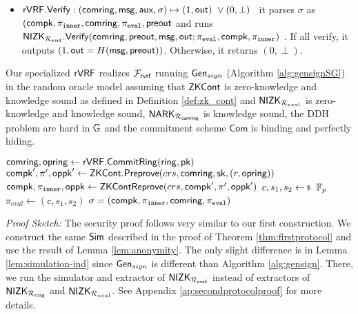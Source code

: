 \begin{itemize}
	\item  ${\mathsf{rVRF}}.{\mathsf{Verify}} : (\mathsf{comring},\mathsf{msg},\mathsf{aux},\sigma) \mapsto (1,{\mathsf{out}}) \,\, \lor (0,\perp)$ \,
	it parses $\sigma$ as $(\mathsf{compk}, \pi_{\mathtt{inner}},\mathsf{comring}, \pi_{\mathtt{eval}}, {\mathsf{preout}}$ and runs  ${\mathsf{NIZK}}_{\mathcal{R}_{\mathtt{rvrf}}}.{\mathsf{Verify}}(\mathsf{comring}, {\mathsf{preout}}, \mathsf{msg}, {\mathsf{out}}; \pi_{\mathtt{eval}},\mathsf{compk}, \pi_{\mathtt{inner}})$  . If all verify, it outputs $ (1,{\mathsf{out}} = H(\mathsf{msg},{\mathsf{preout}})) $. Otherwise, it returns $ (0,\perp) $.
\end{itemize}




\begin{theorem}\label{thm:rvrfspecial}
	Our specialized $ {\mathsf{rVRF}} $   realizes $ \mathcal{F}_{\textsf{rvrf}} $ running $ \mathsf{Gen}_{sign} $ (Algorithm \ref{alg:gensignSG}) \cite{canetti1,canetti2} in the random oracle model assuming that ${\mathsf{ZKCont}} $ is zero-knowledge and knowledge sound as defined in Definition \ref{def:zk_cont} and $ {\mathsf{NIZK}}_{\mathcal{R}_{eval}} $ is zero-knowledge and knowledge sound, $ \mathsf{NARK}_{\mathcal{R}_{\mathsf{comring}}} $ is knowledge sound, the DDH problem are hard in $ {\mathbb{G}}  $  and the commitment scheme $ \mathsf{Com} $ is binding and perfectly hiding. 
\end{theorem}
\begin{algorithm}
	\eprint{}{\scriptsize}
	\caption{$\Gen_{sign}(\ring, \sk= (x,r),\pk,\aux,\msg)$}
	\label{alg:gensignSG}	 	
	\begin{algorithmic}[1]
		\State $ \mathsf{comring}, \mathsf{opring} \leftarrow {\ensuremath{\mathsf{rVRF}}}.{\mathsf{CommitRing}}(\mathsf{ring}, \mathsf{pk}) $
		\State $ \mathsf{compk}', \pi', \mathsf{oppk}' \leftarrow {\ensuremath{\mathsf{ZKCont}}}.{\mathsf{Preprove}}(crs, \mathsf{comring},\mathsf{sk},(r,\mathsf{opring})) $
		\State $ \mathsf{compk}, \pi_{\mathtt{inner}}, \mathsf{oppk} \leftarrow {\ensuremath{\mathsf{ZKCont}}}{\ensuremath{\mathsf{Reprove}}}(crs, \mathsf{compk}',\pi',\mathsf{oppk}') $ 
		\State $ c,s_1, s_2 \leftsample \F_p $
		\State $ \pi_{eval}  \leftarrow (c,s_1, s_2)$		
		\State\Return$ \sigma = (\mathsf{compk}, \pi_{\mathtt{inner}},\mathsf{comring}, \pi_{\mathtt{eval}}) $
	\end{algorithmic}
	
\end{algorithm}

\noindent \textit{Proof Sketch:}  The security proof follows very similar to our first construction.
We construct the same $ \mathsf{Sim} $ described in the proof of Theorem \ref{thm:firstprotocol} and use the result of Lemma \ref{lem:anonymity}. The only slight difference is in Lemma \ref{lem:simulation-ind} since $ \mathsf{Gen}_{sign} $ is different than Algorithm \ref{alg:gensign}. There, we run the simulator and extractor of $ {\mathsf{NIZK}}_{\mathcal{R}_{\mathtt{rvrf}}} $  instead of extractors of  $ {\mathsf{NIZK}}_{\mathcal{R}_{\mathtt{ring}}} $ and $ {\mathsf{NIZK}}_{\mathcal{R}_{eval}} $. See Appendix \ref{ap:secondprotocolproof} for more details.



